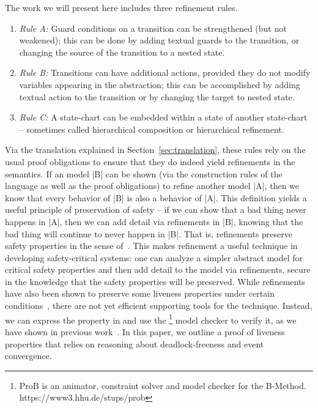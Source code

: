 

The work we will present here includes three refinement rules.
\begin{enumerate}
\item  \emph{Rule A:} Guard conditions on a transition can be strengthened (but not weakened); 
this can be done by adding textual guards to the transition, or
changing the source of the transition to a nested state.
\item \emph{Rule B:} Transitions can have additional actions, provided they do not
  modify variables appearing in the abstraction; this can be 
  accomplished by adding textual action to the transition 
  or by changing the target to nested state.
\item \emph{Rule C:} A state-chart can be embedded within a state of another
  state-chart -- sometimes called hierarchical composition or
  hierarchical refinement.
\end{enumerate}
Via the translation explained in Section~\ref{sec:translation}, these
rules rely on the usual \EventB proof obligations to ensure that they
do indeed yield refinements in the \EventB semantics.  If an \EventB
model |B| can be shown (via the construction rules of the \EventB
language as well as the proof obligations) to refine another \EventB
model |A|, then we know that every behavior of |B| is also a behavior
of |A|. This definition yields a useful principle of preservation of
safety -- if we can show that a bad thing never happens in |A|, then
we can add detail via refinements in |B|, knowing that the bad thing
will continue to never happen in |B|. That is, \EventB refinements
preserve safety properties in the sense
of~\cite{lamport1977proving}. This makes refinement a useful technique
in developing safety-critical systems: one can analyze a simpler
abstract model for critical safety properties and then add detail to
the model via refinements, secure in the knowledge that the safety
properties will be preserved. While \EventB refinements have also been
shown to preserve some liveness properties under certain
conditions~\cite{hoang2016ltl}, there are not yet efficient supporting
tools for the technique. Instead, we can express the property in \LTL
and use the \PROB\footnote{ProB is an animator, constraint solver and
  model checker for the B-Method. https://www3.hhu.de/stups/prob}
model checker to verify it, as we have shown in previous
work~\cite{detect2020}.  In this paper, we outline a proof of liveness
properties that relies on reasoning about deadlock-freeness and event
convergence.



